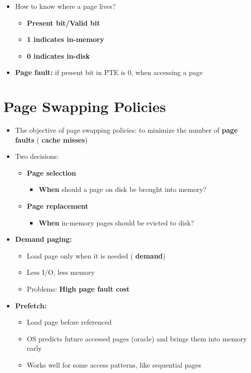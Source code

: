 \documentclass[a4paper,11pt,english]{article}
\begin{document}
\begin{itemize}
    \item How to know where a page lives?
        \begin{itemize}
            \item \textbf{\color{blue} Present bit/Valid bit}
            \item \textbf{\color{blue} 1 indicates in-memory}
            \item \textbf{\color{red} 0 indicates in-disk}
        \end{itemize}
    \item \textbf{\color{red} Page fault:} if present bit in PTE is 0, when accessing a page
\end{itemize}

\section*{Page Swapping Policies}
\begin{itemize}
    \item The objective of page swapping policies: to minimize the number of \textbf{\color{red} page faults} (\textbf{\color{red} cache misses})
    \item Two decisions:
        \begin{itemize}
            \item \textbf{\color{blue} Page selection}
                \begin{itemize}
                    \item \textbf{\color{blue} When} should a page on disk be brought into memory?
                \end{itemize}
            \item \textbf{\color{blue} Page replacement}
                \begin{itemize}
                    \item \textbf{\color{blue} When} in-memory pages should be evicted to disk?
                \end{itemize}
        \end{itemize}
    \item \textbf{\color{blue} Demand paging:}
        \begin{itemize}
            \item Load page only when it is needed (\textbf{\color{blue} demand})
            \item Less I/O, less memory
            \item Problems: \textbf{\color{red} High page fault cost}
        \end{itemize}
    \item \textbf{\color{blue} Prefetch:}
        \begin{itemize}
            \item Load page before referenced
            \item OS predicts future accessed pages (oracle) and brings them into memory early
            \item Works well for some access patterns, like sequential pages
        \end{itemize}
\end{itemize}
\end{document}
